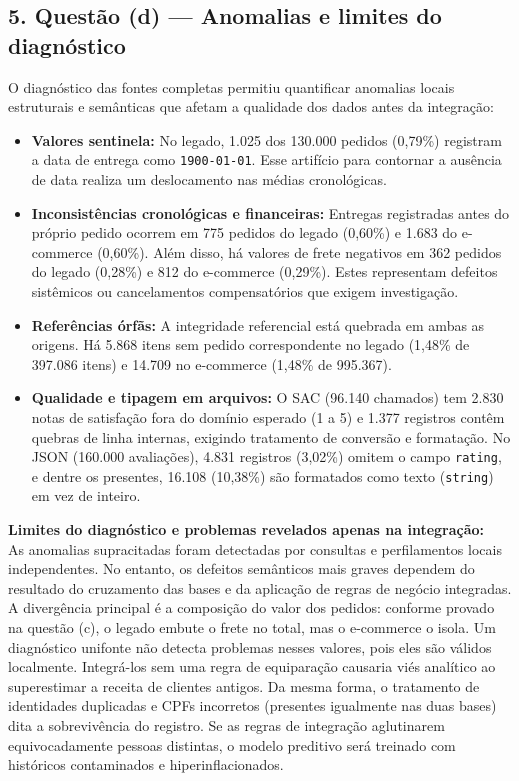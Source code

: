 \documentclass[11pt,a4paper]{article}
\providecommand{\tightlist}{\setlength{\itemsep}{0pt}\setlength{\parskip}{0pt}}
\begin{document}
\subsection{5. Questão (d) --- Anomalias e limites do
diagnóstico}\label{questuxe3o-d-anomalias-e-limites-do-diagnuxf3stico}

O diagnóstico das fontes completas permitiu quantificar anomalias locais estruturais e semânticas que afetam a qualidade dos dados antes da integração:

\begin{itemize}
\tightlist
\item
  \textbf{Valores sentinela:} No legado, 1.025 dos 130.000 pedidos (0,79\%) registram a data de entrega como \texttt{1900-01-01}. Esse artifício para contornar a ausência de data realiza um deslocamento nas médias cronológicas.
\item
  \textbf{Inconsistências cronológicas e financeiras:} Entregas registradas antes do próprio pedido ocorrem em 775 pedidos do legado (0,60\%) e 1.683 do e-commerce (0,60\%). Além disso, há valores de frete negativos em 362 pedidos do legado (0,28\%) e 812 do e-commerce (0,29\%). Estes representam defeitos sistêmicos ou cancelamentos compensatórios que exigem investigação.
\item
  \textbf{Referências órfãs:} A integridade referencial está quebrada em ambas as origens. Há 5.868 itens sem pedido correspondente no legado (1,48\% de 397.086 itens) e 14.709 no e-commerce (1,48\% de 995.367).
\item
  \textbf{Qualidade e tipagem em arquivos:} O SAC (96.140 chamados) tem 2.830 notas de satisfação fora do domínio esperado (1 a 5) e 1.377 registros contêm quebras de linha internas, exigindo tratamento de conversão e formatação. No JSON (160.000 avaliações), 4.831 registros (3,02\%) omitem o campo \texttt{rating}, e dentre os presentes, 16.108 (10,38\%) são formatados como texto (\texttt{string}) em vez de inteiro.
\end{itemize}

\textbf{Limites do diagnóstico e problemas revelados apenas na integração:}\\
As anomalias supracitadas foram detectadas por consultas e perfilamentos locais independentes. No entanto, os defeitos semânticos mais graves dependem do resultado do cruzamento das bases e da aplicação de regras de negócio integradas.
A divergência principal é a composição do valor dos pedidos: conforme provado na questão (c), o legado embute o frete no total, mas o e-commerce o isola. Um diagnóstico unifonte não detecta problemas nesses valores, pois eles são válidos localmente. Integrá-los sem uma regra de equiparação causaria viés analítico ao superestimar a receita de clientes antigos. Da mesma forma, o tratamento de identidades duplicadas e CPFs incorretos (presentes igualmente nas duas bases) dita a sobrevivência do registro. Se as regras de integração aglutinarem equivocadamente pessoas distintas, o modelo preditivo será treinado com históricos contaminados e hiperinflacionados.
\end{document}
